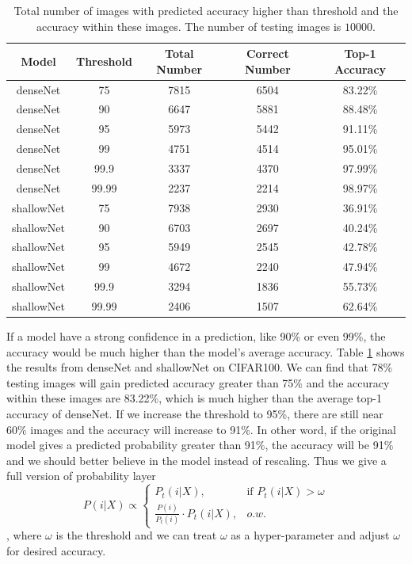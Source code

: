\documentclass{article}
\begin{document}
{\begin{table}
\begin{center}
\begin{tabular}{ |c|c|c|c|c| } 
 \hline
 Model & Threshold & Total Number & Correct Number & Top-1 Accuracy \\
 \hline
 denseNet & 75 & 7815 & 6504 & 83.22\% \\
 \hline
 denseNet & 90 & 6647 & 5881 & 88.48\% \\
 \hline
 denseNet & 95 & 5973 & 5442 & 91.11\% \\
 \hline
 denseNet & 99 & 4751 & 4514 & 95.01\% \\
 \hline
 denseNet & 99.9 & 3337 & 4370 & 97.99\% \\
 \hline
 denseNet & 99.99 & 2237 & 2214 & 98.97\% \\
 \hline
 shallowNet & 75 & 7938 & 2930 & 36.91\% \\
 \hline
 shallowNet & 90 & 6703 & 2697 & 40.24\% \\
 \hline
 shallowNet & 95 & 5949 & 2545 & 42.78\% \\
 \hline
 shallowNet & 99 & 4672 & 2240 & 47.94\% \\
 \hline
 shallowNet & 99.9 & 3294 & 1836 & 55.73\% \\
 \hline
 shallowNet & 99.99 & 2406 & 1507 & 62.64\% \\
 \hline
\end{tabular}
\end{center}
\caption{Total number of images with predicted accuracy higher than threshold and the accuracy within these images. The number of testing images is $10000$.}
\label{table:threshold}
\end{table}
If a model have a strong confidence in a prediction, like 90\% or even 99\%, the accuracy would be much higher than the model's average accuracy. Table \ref{table:threshold} shows the results from denseNet and shallowNet on CIFAR100. We can find that 78\% testing images will gain predicted accuracy greater than 75\% and the accuracy within these images are 83.22\%, which is much higher than the average top-1 accuracy of denseNet. If we increase the threshold to 95\%, there are still near 60\% images and the accuracy will increase to 91\%. In other word, if the original model gives a predicted probability greater than 91\%, the accuracy will be 91\% and we should better believe in the model instead of rescaling. Thus we give a full version of probability layer
\begin{equation}
P(i|X) \propto \begin{cases}
P_t(i|X), &\text{if $P_t(i|X)> \omega$}\\
\frac{P(i)}{P_t(i)} \cdot P_t(i|X), &\text{$o.w.$}
\end{cases}
\end{equation},
where $\omega$ is the threshold and we can treat $\omega$ as a hyper-parameter and adjust $\omega$ for desired accuracy. 




}
\end{document}
